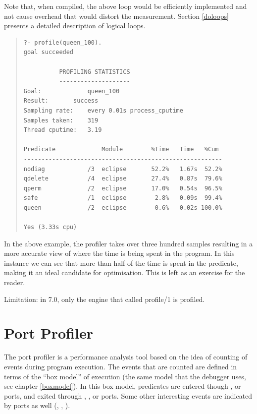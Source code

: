 Note that, when compiled, the above  loop would be
efficiently implemented and not cause overhead that would distort the
measurement.  Section \ref{doloops} presents a
detailed description of logical loops.

\vfill %

\begin{quote}
\begin{verbatim}
?- profile(queen_100).
goal succeeded

		  PROFILING STATISTICS
		  --------------------
Goal:             queen_100
Result:		  success
Sampling rate:	  every 0.01s process_cputime
Samples taken:	  319
Thread cputime:	  3.19

Predicate             Module        %Time   Time   %Cum
--------------------------------------------------------
nodiag            /3  eclipse       52.2%   1.67s  52.2%
qdelete           /4  eclipse       27.4%   0.87s  79.6%
qperm             /2  eclipse       17.0%   0.54s  96.5%
safe              /1  eclipse        2.8%   0.09s  99.4%
queen             /2  eclipse        0.6%   0.02s 100.0%

Yes (3.33s cpu)
\end{verbatim}
\end{quote}

In the above example, the profiler takes over three hundred samples
resulting in a more accurate view of where the time is being spent in
the program.  In this instance we can see that more than half of the
time is spent in the  predicate, making it an ideal
candidate for optimisation.  This is left as an exercise for the
reader.

Limitation: in \eclipse{}7.0, only the engine that called profile/1
is profiled.

\section{Port Profiler}
The port profiler is a performance analysis tool based on the idea of
counting of events during program execution.  The events that are
counted are defined in terms of the ``box model'' of execution (the same
model that the debugger uses, see chapter \ref{boxmodel}).  In this
box model, predicates are entered though ,  or
 ports,
and exited through , ,  or 
ports.  Some other interesting events are indicated by ports as well
(, , ).

